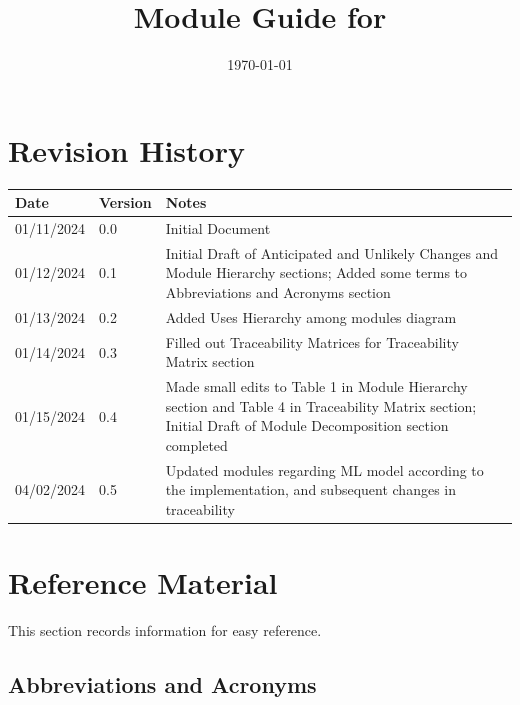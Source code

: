 \documentclass[12pt, titlepage]{article}
\begin{document}
\title{Module Guide for \progname{}} 
\author{\authname}
\date{\today}

\maketitle


\section{Revision History}

\begin{tabularx}{\textwidth}{p{3cm}p{2cm}X}
\toprule {\bf Date} & {\bf Version} & {\bf Notes}\\
\midrule
01/11/2024 & 0.0 & Initial Document \\
01/12/2024 & 0.1 & Initial Draft of Anticipated and Unlikely Changes and
  Module Hierarchy sections; Added some terms to Abbreviations and Acronyms
  section \\
01/13/2024 & 0.2 & Added Uses Hierarchy among modules diagram \\
01/14/2024 & 0.3 & Filled out Traceability Matrices for Traceability Matrix
  section \\
01/15/2024 & 0.4 & Made small edits to Table 1 in Module Hierarchy section and
  Table 4 in Traceability Matrix section; Initial Draft of Module
  Decomposition section completed \\
04/02/2024 & 0.5 & Updated modules regarding ML model according to the implementation, and subsequent changes in traceability \\
\bottomrule
\end{tabularx}

\newpage

\section{Reference Material}

This section records information for easy reference.

\subsection{Abbreviations and Acronyms}
\end{document}
